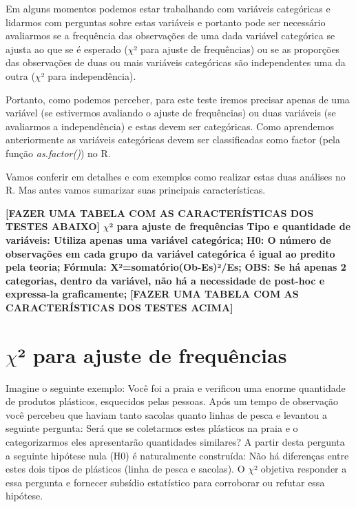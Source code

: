 \documentclass[titlepage, oneside, openany, a4paper]{book}
\begin{document}
Em alguns momentos podemos estar trabalhando com variáveis categóricas e lidarmos com perguntas sobre estas variáveis e portanto pode ser necessário avaliarmos se a frequência das observações de uma dada variável categórica se ajusta ao que se é esperado (\(\chi\)² para ajuste de frequências) ou se as proporções das observações de duas ou mais variáveis categóricas são independentes uma da outra (\(\chi\)² para independência).

Portanto, como podemos perceber, para este teste iremos precisar apenas de uma variável (se estivermos avaliando o ajuste de frequências) ou duas variáveis (se avaliarmos a independência) e estas devem ser categóricas. Como aprendemos anteriormente as variáveis categóricas devem ser classificadas como factor (pela função \emph{as.factor()}) no R.

Vamos conferir em detalhes e com exemplos como realizar estas duas análises no R. Mas antes vamos sumarizar suas principais características.

\textbf{{[}FAZER UMA TABELA COM AS CARACTERÍSTICAS DOS TESTES ABAIXO{]}}
\textbf{\(\chi\)² para ajuste de frequências}
\textbf{Tipo e quantidade de variáveis: Utiliza apenas uma variável categórica;}
\textbf{H0: O número de observações em cada grupo da variável categórica é igual ao predito pela teoria;}
\textbf{Fórmula: X²=somatório(Ob-Es)²/Es;}
\textbf{OBS: Se há apenas 2 categorias, dentro da variável, não há a necessidade de post-hoc e expressa-la graficamente;}
\textbf{{[}FAZER UMA TABELA COM AS CARACTERÍSTICAS DOS TESTES ACIMA{]}}

\hypertarget{chi-para-ajuste-de-frequuxeancias}{%
\section{\texorpdfstring{\(\chi\)² para ajuste de frequências}{\textbackslash{}chi² para ajuste de frequências}}\label{chi-para-ajuste-de-frequuxeancias}}

Imagine o seguinte exemplo: Você foi a praia e verificou uma enorme quantidade de produtos plásticos, esquecidos pelas pessoas. Após um tempo de observação você percebeu que haviam tanto sacolas quanto linhas de pesca e levantou a seguinte pergunta: Será que se coletarmos estes plásticos na praia e o categorizarmos eles apresentarão quantidades similares? A partir desta pergunta a seguinte hipótese nula (H0) é naturalmente construída: Não há diferenças entre estes dois tipos de plásticos (linha de pesca e sacolas). O \(\chi\)² objetiva responder a essa pergunta e fornecer subsídio estatístico para corroborar ou refutar essa hipótese.
\end{document}

